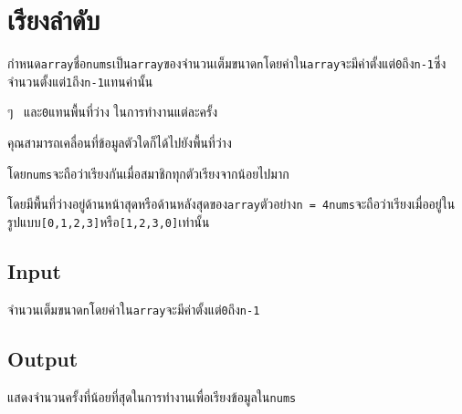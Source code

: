\documentclass{article}
\begin{document}
\section*{เรียงลำดับ}

กำหนด\texttt{array}ชื่อ\texttt{nums}เป็น\texttt{array}ของจำนวนเต็มขนาด\texttt{n}โดยค่าใน\texttt{array}จะมีค่าตั้งแต่\texttt{0}ถึง\texttt{n-1}ซึ่งจำนวนตั้งแต่\texttt{1}ถึง\texttt{n-1}แทนค่านั้น

ๆ~ และ\texttt{0}แทนพื้นที่ว่าง ในการทำงานแต่ละครั้ง

คุณสามารถเคลื่อนที่ข้อมูลตัวใดก็ได้ไปยังพื้นที่ว่าง

โดย\texttt{nums}จะถือว่าเรียงกันเมื่อสมาชิกทุกตัวเรียงจากน้อยไปมาก

โดยมีพื้นที่ว่างอยู่ด้านหน้าสุดหรือด้านหลังสุดของ\texttt{array}ตัวอย่าง\texttt{n\ =\ 4}\texttt{nums}จะถือว่าเรียงเมื่ออยู่ในรูปแบบ\texttt{{[}0,1,2,3{]}}หรือ\texttt{{[}1,2,3,0{]}}เท่านั้น\\



\subsection*{Input}
{จำนวนเต็มขนาด}\texttt{n}{โดยค่าใน}\texttt{array}{จะมีค่าตั้งแต่}\texttt{0}{ถึง}\texttt{n-1}\\



\subsection*{Output}
แสดงจำนวนครั้งที่น้อยที่สุดในการทำงานเพื่อเรียงข้อมูลใน\texttt{nums}
\end{document}

